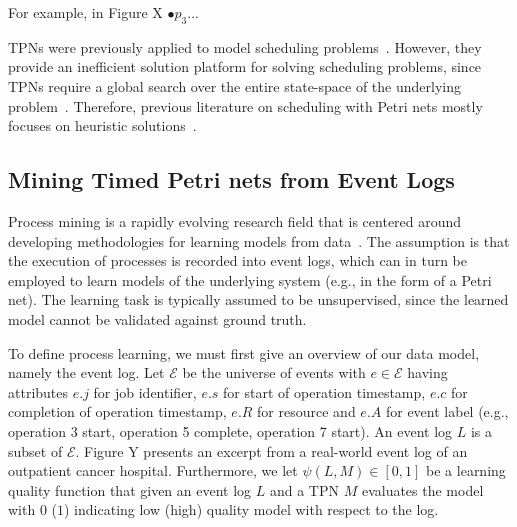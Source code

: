 For example,
in Figure X $\bullet p_3$...  

%
 
TPNs were previously applied
to model scheduling problems~\cite{van1996petri,lee1994scheduling}. 
However, they provide an inefficient solution platform for solving scheduling
problems,
since TPNs require a 
global search over 
the entire state-space
of the underlying problem~\cite{lee1994scheduling}. 
Therefore, 
previous literature on scheduling with Petri nets mostly
focuses on heuristic solutions~\cite{lee1994scheduling}.

\subsection{Mining Timed Petri nets from Event Logs}

Process mining is a rapidly evolving research field 
that is centered around developing methodologies
for learning models from data~\cite{AalstBook}.
The assumption is that the execution of processes
is recorded into event logs, which can in turn be employed 
to learn models of the underlying system
(e.g., in the form of a Petri net). The learning
task is typically assumed to be unsupervised, since 
the learned model cannot be validated against ground truth. 

To define process learning, we must first give an overview of
our data model, namely the event log. 
Let $\mathcal{E}$ be the universe of events
with $e \in \mathcal{E}$ having attributes $e.j$ for 
job identifier, $e.s$ for start of operation 
timestamp, $e.c$ for completion of operation timestamp, 
$e.R$ for resource and $e.A$ for event label (e.g., operation 3 start, operation 5 complete, operation 7 start). 
An event log $L$ is a subset of $\mathcal{E}$. 
Figure Y presents an excerpt from a real-world event log
of an outpatient cancer hospital. Furthermore,
we let $\psi(L,M) \in [0,1]$ be a learning
quality function that given
an event log $L$ and a TPN $M$ evaluates the model 
with $0$ ($1$) indicating low (high) quality model
with respect to the log. 

